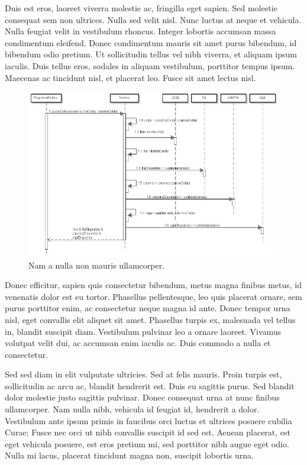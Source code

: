 \documentclass[titlepage,a4paper]{article}
\begin{document}
Duis est eros, laoreet viverra molestie ac, fringilla eget sapien. Sed molestie consequat sem non ultrices. Nulla sed velit nisl. Nunc luctus at neque et vehicula. Nulla feugiat velit in vestibulum rhoncus. Integer lobortis accumsan massa condimentum eleifend. Donec condimentum mauris sit amet purus bibendum, id bibendum odio pretium. Ut sollicitudin tellus vel nibh viverra, et aliquam ipsum iaculis. Duis tellus eros, sodales in aliquam vestibulum, porttitor tempus ipsum. Maecenas ac tincidunt nisl, et placerat leo. Fusce sit amet lectus nisl.

\begin{figure}[H]
\centering
\includegraphics[width=\textwidth]{diagrama_secuencia02.png}
\caption{\label{fig:seq02}Nam a nulla non mauris ullamcorper.}
\end{figure}

Donec efficitur, sapien quis consectetur bibendum, metus magna finibus metus, id venenatis dolor est eu tortor. Phasellus pellentesque, leo quis placerat ornare, sem purus porttitor enim, ac consectetur neque magna id ante. Donec tempor urna nisl, eget convallis elit aliquet sit amet. Phasellus turpis ex, malesuada vel tellus in, blandit suscipit diam. Vestibulum pulvinar leo a ornare laoreet. Vivamus volutpat velit dui, ac accumsan enim iaculis ac. Duis commodo a nulla et consectetur.

Sed sed diam in elit vulputate ultricies. Sed at felis mauris. Proin turpis est, sollicitudin ac arcu ac, blandit hendrerit est. Duis eu sagittis purus. Sed blandit dolor molestie justo sagittis pulvinar. Donec consequat urna at nunc finibus ullamcorper. Nam nulla nibh, vehicula id feugiat id, hendrerit a dolor. Vestibulum ante ipsum primis in faucibus orci luctus et ultrices posuere cubilia Curae; Fusce nec orci ut nibh convallis suscipit id sed est. Aenean placerat, est eget vehicula posuere, est eros pretium mi, sed porttitor nibh augue eget odio. Nulla mi lacus, placerat tincidunt magna non, suscipit lobortis urna.
\end{document}
